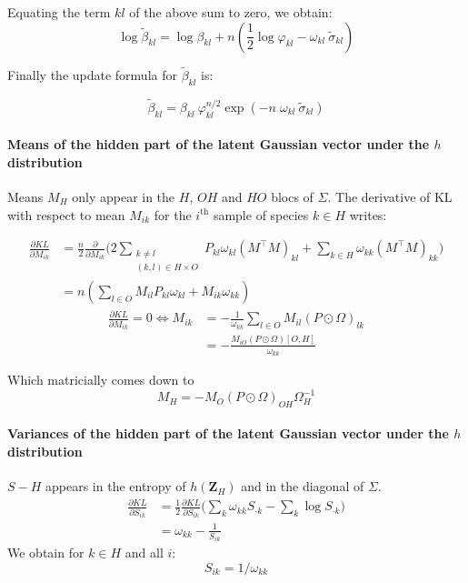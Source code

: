 \documentclass[11pt,a4paper]{article}
\newcommand{\Zbf}{\boldsymbol{Z}}
\begin{document}
 
Equating the term $kl$ of the above sum to zero, we obtain:
 $$\log \widetilde{\beta}_{kl} = \log \beta_{kl} + n\left( \frac{1}{2} \log \varphi_{kl} - \omega_{kl}\: \widetilde{\sigma}_{kl} \right) $$
 
 Finally the update formula for $\widetilde{\beta}_{kl}$ is:
 
  $$\boxed{\displaystyle \widetilde{\beta}_{kl} = \beta_{kl} \: \varphi_{kl}^{n/2} \exp( -n\;\omega_{kl}\: \widetilde{\sigma}_{kl} ) }$$
 
\paragraph{Means of the hidden part of the latent Gaussian vector under the $h$ distribution \\}
Means $M_H$ only appear in the $H$, $OH$ and $HO$ blocs of $\Sigma$. The derivative of KL with respect to mean $M_{ik}$ for the $i^\text{th}$ sample of species $k\in H$ writes:

\begin{align*}
\frac{\partial KL}{\partial M_{ik}} &=\frac{n}{2}\frac{\partial}{\partial M_{ik}}\Big(2\sum_{\substack{k \neq l\\
(k, l) \in H\times O}} P_{kl} \omega_{kl} (M^\intercal M)_{kl} + \sum_{k\in H} \omega_{kk} (M^\intercal M)_{kk}\Big)\\
&= n( \sum_{l \in O } M_{il} P_{kl}\omega_{kl} + M_{ik} \omega_{kk}) 
\end{align*}
\begin{align*}
\frac{\partial KL}{\partial M_{ik}}  = 0\iff M_{ik} &= -\frac{1}{\omega_{kk}} \sum_{l\in O} M_{il} (P\odot\Omega)_{lk}\\
&=-\frac{M_{iO} (P\odot\Omega)[O,H]}{\omega_{kk}}
\end{align*}

Which  matricially comes down to
$$\boxed{ M_H = -M_O(P\odot\Omega)_{OH} \Omega_H^{-1}}$$


\paragraph{Variances of the hidden part of the latent Gaussian vector under the $h$ distribution \\}
$S-H$ appears in the entropy of $h(\Zbf_H)$ and in the diagonal of $\Sigma$. 
\begin{align*}
\frac{\partial KL}{\partial S_{ik}} &= \frac{1}{2}  \frac{\partial KL}{\partial S_{ik}}  \Big(\sum_k \omega_{kk} S_{\cdot k} - \sum_k \log S_{\cdot k}\Big)\\
&=\omega_{kk} - \frac{1}{S_{ik}}
\end{align*}
We obtain for $k\in H$ and all $i$:
$$\boxed{S_{ik} = 1/\omega_{kk}}$$
\end{document}
